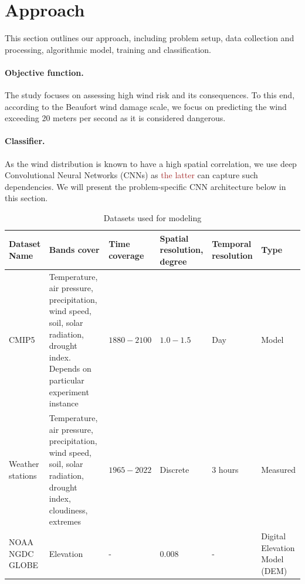 \documentclass{article}
\begin{document}
\section{Approach}
\label{sec:methodology}

This section outlines our approach, including problem setup, data collection and processing, algorithmic model,  training and classification.

\paragraph {Objective function.} The study focuses on assessing high wind risk and its consequences. To this end, according to the Beaufort wind damage scale, we focus on predicting the wind exceeding 20 meters per second as it is considered dangerous. 

\paragraph {Classifier.} As the wind distribution is known to have a high spatial correlation, we use deep Convolutional Neural Networks (CNNs) as \textcolor{brown}{the latter} can capture such dependencies. We will present the problem-specific CNN architecture below in this section. 

\begin{table}[t]
    \centering
    \begin{tabular}{p{3cm}|p{4.7cm}|R{2.1cm}|R{2cm}|p{1.7cm}|p{1.6cm}} %
        \toprule
        Dataset Name & Bands cover & Time coverage & Spatial resolution, degree & Temporal resolution & Type  \\
        \midrule
        CMIP5 \cite{SeijiYukimoto20122012-A02} & Temperature, air pressure, precipitation, wind speed, soil, solar radiation, drought index. Depends on particular experiment instance & $1880 - 2100$ & $1.0 - 1.5$ &  Day & Model \\
        \midrule
        Weather stations &  Temperature, air pressure, precipitation, wind speed, soil, solar radiation, drought index, cloudiness, extremes & $1965 - 2022$ & Discrete &  3 hours & Measured\\
        \midrule
        NOAA NGDC GLOBE \cite{hastings1998development} &  Elevation & - & $0.008$ &  - & 
        Digital Elevation Model (DEM) \\
        \bottomrule
    \end{tabular}
    \caption{Datasets used for modeling%
    }
    \label{tab:datasets}
\end{table}
\end{document}
